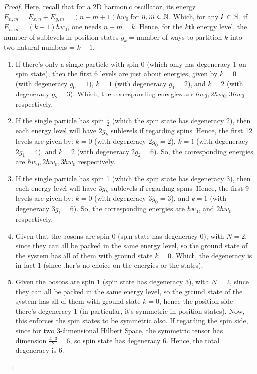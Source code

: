 \documentclass{article}
\begin{document}
\begin{proof}
    Here, recall that for a 2D harmonic oscillator, its energy $E_{n,m} = E_{x,n}+E_{y,m} = (n+m+1)\hbar w_0$ for $n,m\in\mathbb{N}$. Which, for any $k \in \mathbb{N}$, if $E_{n,m}=(k+1)\hbar w_0$, one needs $n+m=k$. Hence, for the $k$th energy level, the number of sublevels in position states $g_k$ = number of ways to partition $k$ into two natural numbers = $k+1$.

    \hfil

    \begin{enumerate}
        \item If there's only a single particle with spin $0$ (which only has degeneracy 1 on spin state), then the first 6 levels are just about energies, given by $k=0$ (with degeneracy $g_0=1$), $k=1$ (with degeneracy $g_1=2$), and $k=2$ (with degeneracy $g_2 = 3$). Which, the corresponding energies are $\hbar w_0, 2\hbar w_0,3\hbar w_0$ respectively.
        
        \hfil

        \item If the single particle has spin $\frac{1}{2}$ (which the spin state has degeneracy 2), then each energy level will have $2g_k$ sublevels if regarding spins. Hence, the first 12 levels are given by: $k=0$ (with degeneracy $2g_0 = 2$), $k=1$ (with degeneracy $2g_1=4$), and $k=2$ (with degeneracy $2g_2 = 6$). So, the corresponding energies are $\hbar w_0, 2\hbar w_0,3\hbar w_0$ respectively.
        
        \hfil

        \item If the single particle has spin 1 (which the spin state has degeneracy 3), then each energy level will have $3g_k$ sublevels if regarding spins. Hence, the first 9 levels are given by: $k=0$ (with degeneracy $3g_0=3$), and $k=1$ (with degeneracy $3g_1=6$). So, the corresponding energies are $\hbar w_0$, and $2\hbar w_0$ respectively.
        
        \hfil

        \item Given that the bosons are spin $0$ (spin state has degeneracy $0$), with $N=2$, since they can all be packed in the same energy level, so the ground state of the system has all of them with ground state $k=0$. Which, the degeneracy is in fact 1 (since ther's no choice on the energies or the states).
        
        \hfil

        \item Given the bosons are spin 1 (spin state has degeneracy $3$), with $N=2$, since they can all be packed in the same energy level, so the ground state of the system has all of them with ground state $k=0$, hence the position side there's degeneracy $1$ (in particular, it's symmetric in position states). Now, this enforces the spin states to be symmetric also. If regarding the spin side, since for two $3$-dimensional Hilbert Space, the symmetric tensor has dimension $\frac{4\cdot 3}{2}=6$, so spin state has degeneracy $6$. Hence, the total degeneracy is $6$.
        

\end{enumerate}
\end{proof}
\end{document}
